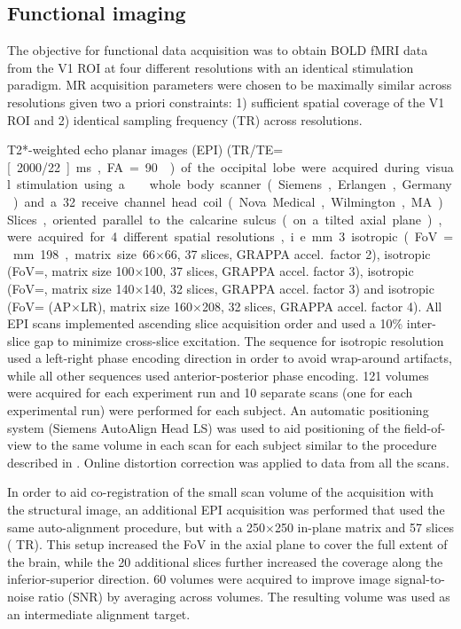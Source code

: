 \subsection*{Functional imaging}
\noindent The objective for functional data acquisition was to obtain BOLD fMRI
data from the V1 ROI at four different resolutions with an identical
stimulation paradigm. MR acquisition parameters were chosen to be maximally
similar across resolutions given two a priori constraints: 1) sufficient
spatial coverage of the V1 ROI and 2) identical sampling frequency (TR) across
resolutions.

T2*-weighted echo planar images (EPI) (TR/TE=\unit[2000/22]{ms},
FA=90\textdegree) of the occipital lobe were acquired during visual stimulation
using a \sevenT\ whole body scanner (Siemens, Erlangen, Germany) and a 32
receive channel head coil (Nova Medical, Wilmington, MA). Slices, oriented
parallel to the calcarine sulcus (on a tilted axial plane), were acquired for 4
different spatial resolutions, i.e. \mm{3} isotropic (FoV=\mm{198}, matrix
size 66$\times$66, 37 slices, GRAPPA accel.~factor 2),  isotropic
(FoV=, matrix size 100$\times$100, 37 slices, GRAPPA accel. factor 3),
 isotropic (FoV=, matrix size 140$\times$140, 32 slices, GRAPPA
accel. factor 3) and  isotropic (FoV=
(AP$\times$LR), matrix size 160$\times$208, 32 slices, GRAPPA accel. factor
4). All EPI scans implemented ascending slice acquisition order and used a 10\%
inter-slice gap to minimize cross-slice excitation. The sequence for 
isotropic resolution used a left-right phase encoding direction in order to
avoid wrap-around artifacts, while all other sequences used anterior-posterior
phase encoding. 121 volumes were acquired for each experiment run and 10
separate scans (one for each experimental run) were performed for each subject.
An automatic positioning system (Siemens AutoAlign Head LS) was used to aid
positioning of the field-of-view to the same volume in each scan for each
subject similar to the procedure described in \citet{Dou_2014}. 
Online distortion correction \citep{in_2012} was applied to data from
all the scans.

In order to aid co-registration of the small scan volume of the 
acquisition with the structural image, an additional EPI acquisition was
performed that used the same auto-alignment procedure, but with a 250$\times$250
in-plane matrix and 57 slices ( TR). This setup increased the FoV in
the axial plane to cover the full extent of the brain, while the 20 additional
slices further increased the coverage along the inferior-superior direction. 60
volumes were acquired to improve image signal-to-noise ratio (SNR) by averaging
across volumes. The resulting volume was used as an intermediate alignment
target.


